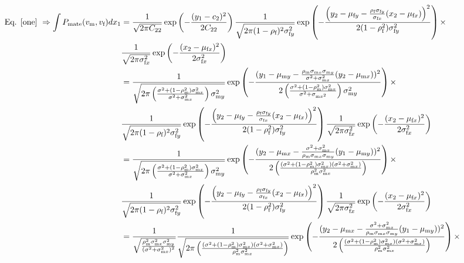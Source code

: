 \documentclass{article}
\newcommand{\x}[1]{\text{#1}}
\begin{document}
 \begin{align*}
 \text{ Eq. \ref{one} } \Rightarrow \int P_\text{mate}(v_\x{m},v_\x{f})dx_1&=\frac{1}{\sqrt{2\pi C_{22}}}\exp\left(-\frac{(y_1-c_2)^2}{2C_{22}}\right)\frac{1}{\sqrt{2\pi(1-\rho_\x{f})^2\sigma_{\x{f}y}^2}}\exp\left(-\frac{\left(y_2-\mu_{\x{f}y}-\frac{\rho_\x{f}\sigma_{\x{f}y}}{\sigma_{\x{f}x}}(x_2-\mu_{\x{f}x})\right)^2}{2(1-\rho_\x{f}^2)\sigma_{\x{f}y}^2}\right)\times
\\&\frac{1}{\sqrt{2\pi\sigma_{\x{f}x}^2}}\exp\left(-\frac{(x_2-\mu_{\x{f}x})^2}{2\sigma_{\x{f}x}^2}\right)
\\&=\frac{1}{\sqrt{2\pi \left(\frac{\sigma^2+(1-\rho_\x{m}^2)\sigma_{\x{m}x}^2}{\sigma^2+\sigma_{\x{m}x}^2}\right)\sigma_{\x{m}y}^2}}\exp\left(-\frac{(y_1-\mu_{\x{m}y}-\frac{\rho_\x{m}\sigma_{\x{m}x}\sigma_{\x{m}y}}{\sigma^2+\sigma_{\x{m}x}^2}(y_2-\mu_{\x{m}x}))^2}{2\left(\frac{\sigma^2+(1-\rho_\x{m}^2)\sigma_{\x{m}x}^2}{\sigma^2+\sigma_{\x{m}x^2}}\right)\sigma_{\x{m}y}^2}\right)\times
\\&\frac{1}{\sqrt{2\pi(1-\rho_\x{f})^2\sigma_{\x{f}y}^2}}\exp\left(-\frac{\left(y_2-\mu_{\x{f}y}-\frac{\rho_\x{f}\sigma_{\x{f}y}}{\sigma_{\x{f}x}}(x_2-\mu_{\x{f}x})\right)^2}{2(1-\rho_\x{f}^2)\sigma_{\x{f}y}^2}\right)\frac{1}{\sqrt{2\pi\sigma_{\x{f}x}^2}}\exp\left(-\frac{(x_2-\mu_{\x{f}x})^2}{2\sigma_{\x{f}x}^2}\right)
\\&=\frac{1}{\sqrt{2\pi \left(\frac{\sigma^2+(1-\rho_\x{m}^2)\sigma_{\x{m}x}^2}{\sigma^2+\sigma_{\x{m}x}^2}\right)\sigma_{\x{m}y}^2}}\exp\left(-\frac{(y_2-\mu_{\x{m}x}-\frac{\sigma^2+\sigma_{\x{m}x}^2}{\rho_\x{m}\sigma_{\x{m}x}\sigma_{\x{m}y}}(y_1-\mu_{\x{m}y}))^2}{2\left(\frac{(\sigma^2+(1-\rho_\x{m}^2)\sigma_{\x{m}x}^2)(\sigma^2+\sigma_{\x{m}x}^2)}{\rho_\x{m}^2\sigma_{\x{m}x}^2}\right)}\right)\times
\\&\frac{1}{\sqrt{2\pi(1-\rho_\x{f})^2\sigma_{\x{f}y}^2}}\exp\left(-\frac{\left(y_2-\mu_{\x{f}y}-\frac{\rho_\x{f}\sigma_{\x{f}y}}{\sigma_{\x{f}x}}(x_2-\mu_{\x{f}x})\right)^2}{2(1-\rho_\x{f}^2)\sigma_{\x{f}y}^2}\right)\frac{1}{\sqrt{2\pi\sigma_{\x{f}x}^2}}\exp\left(-\frac{(x_2-\mu_{\x{f}x})^2}{2\sigma_{\x{f}x}^2}\right)
\\&=\frac{1}{\sqrt{\frac{\rho_\x{m}^2\sigma_{\x{m}x}^2\sigma_{\x{m}y}^2}{(\sigma^2+\sigma_{\x{m}x}^2)^2}}}\frac{1}{\sqrt{2\pi \left(\frac{(\sigma^2+(1-\rho_\x{m}^2)\sigma_{\x{m}x}^2)(\sigma^2+\sigma_{\x{m}x}^2)}{\rho_\x{m}^2\sigma_{\x{m}x}^2}\right)}}\exp\left(-\frac{(y_2-\mu_{\x{m}x}-\frac{\sigma^2+\sigma_{\x{m}x}^2}{\rho_\x{m}\sigma_{\x{m}x}\sigma_{\x{m}y}}(y_1-\mu_{\x{m}y}))^2}{2\left(\frac{(\sigma^2+(1-\rho_\x{m}^2)\sigma_{\x{m}x}^2)(\sigma^2+\sigma_{\x{m}x}^2)}{\rho_\x{m}^2\sigma_{\x{m}x}^2}\right)}\right)\times

\end{align*}
\end{document}
